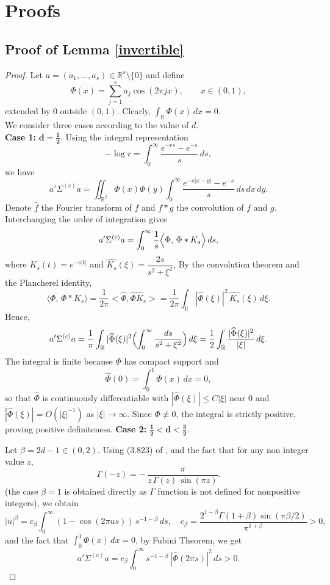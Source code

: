 \documentclass[10pt,a4paper]{amsart}
\numberwithin{equation}{section}
\begin{document}
\section{Proofs}\label{proofs}
\subsection{ Proof of Lemma \ref{invertible}}
\begin{proof}
\medskip
\noindent
Let $a=(a_1,\ldots,a_s)\in\mathbb{R}^s\setminus\{0\}$ and define
\[
\Phi(x) = \sum_{j=1}^{s} a_j \cos(2\pi jx), \qquad x\in(0,1),
\]
extended by $0$ outside $(0,1)$. Clearly, $\displaystyle \int_{\mathbb{R}}\Phi(x)\,dx=0$. \\We consider three cases according to the value of $d$.
\\  
\textbf{Case 1:} $\mathbf{d=\tfrac{1}{2}}$.
Using the integral representation
\[
-\log r = \int_0^\infty \frac{e^{-rs}-e^{-s}}{s}\,ds,
\]
we have
\[
a'\Sigma^{(c)}a = \iint_{\mathbb{R}^2} \Phi(x)\Phi(y)
\!\int_0^\infty \frac{e^{-s|x-y|}-e^{-s}}{s}\,ds\,dx\,dy.
\]
Denote $\hat f$  the Fourier transform of $f$ and $f*g$ the convolution of $f$ and $g$.
Interchanging the order of integration gives
\[
a'\Sigma^{(c)}a = \int_0^\infty \frac{1}{s}
\Bigl\langle \Phi,\, \Phi*K_s \Bigr\rangle\,ds,
\]
where $K_s(t)=e^{-s|t|}$ and $\widehat{K_s}(\xi)=\dfrac{2s}{s^2+\xi^2}$,  
By the convolution theorem and the Plancherel identity,
\[
\langle \Phi,\,\Phi*K_s\rangle
= \frac{1}{2\pi}<\widehat\Phi,\widehat\Phi\widehat K_s>=\frac{1}{2\pi}\int_{\mathbb{R}} |\widehat{\Phi}(\xi)|^2 \,\widehat{K_s}(\xi)\,d\xi.
\]
Hence,
\[
a'\Sigma^{(c)}a
= \frac{1}{\pi}\int_{\mathbb{R}} |\widehat{\Phi}(\xi)|^2
\Bigl(\int_0^\infty \frac{ds}{s^2+\xi^2}\Bigr)\,d\xi
= \frac{1}{2}\int_{\mathbb{R}}\frac{|\widehat{\Phi}(\xi)|^2}{|\xi|}\,d\xi.
\]
The integral is finite because $\Phi$ has compact support and
\[
\widehat{\Phi}(0)=\int_0^1\Phi(x)\,dx=0,
\]
so that $\widehat{\Phi}$ is continuously differentiable with
$|\widehat{\Phi}(\xi)|\le C|\xi|$ near $0$ and $|\widehat{\Phi}(\xi)|=O(|\xi|^{-1})$ as $|\xi|\to\infty$.  
Since $\Phi\not\equiv0$, the integral is strictly positive, proving positive definiteness.  
\medskip
\noindent
\textbf{Case 2:} $\mathbf{\tfrac{1}{2}< d<\tfrac{3}{2}}$.

Let $\beta=2d-1\in(0,2)$.  Using (3.823) of  \cite{gradshteyn2007tables}, and the fact that for any non integer value $z$,
\[
\Gamma(-z) = -\,\frac{\pi}{z\,\Gamma(z)\,\sin(\pi z)}.
\]
(the case $\beta=1$ is obtained directly as $\Gamma$  function is not defined for nonpositive integers), we obtain
\[
|u|^{\beta}
= c_\beta \int_0^\infty (1-\cos(2\pi us))\,s^{-1-\beta}\,ds,
\quad
c_\beta=\frac{2^{1-\beta}\Gamma(1+\beta)\sin(\pi\beta/2)}{\pi^{1+\beta}}>0,
\]
and the fact that $\int_0^1\Phi(x)\,dx=0$, by Fubini Theorem, we get
\[
a'\Sigma^{(c)}a
= c_\beta \int_0^\infty s^{-1-\beta}\,|\widehat{\Phi}(2\pi s)|^2\,ds > 0.
\]


\end{proof}
\end{document}

